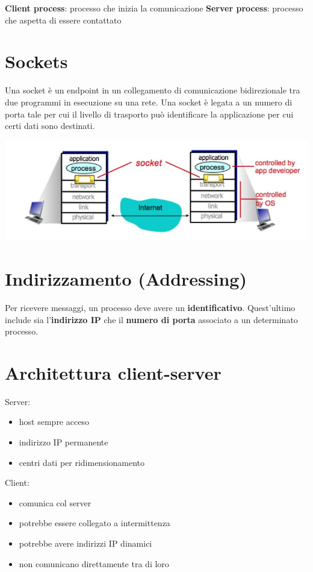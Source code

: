 \textbf{Client process}: processo che inizia la comunicazione
\textbf{Server process}: processo che aspetta di essere contattato 

\section{Sockets}
Una socket è un endpoint in un collegamento di comunicazione bidirezionale tra due programmi in esecuzione su una rete. Una socket è legata a un numero di porta tale per cui il livello di trasporto può identificare la applicazione per cui certi dati sono destinati.

\begin{center}
\includegraphics[scale=0.4]{Images/TecnologieWeb/1/Sockets.jpg}    
\end{center}

\section{Indirizzamento (Addressing)}
Per ricevere messaggi, un processo deve avere un \textbf{identificativo}. Quest'ultimo include sia l'\textbf{indirizzo IP} che il \textbf{numero di porta} associato a un determinato processo. 

\section{Architettura client-server}
Server:
\begin{itemize}
    \item host sempre acceso
    \item indirizzo IP permanente
    \item centri dati per ridimensionamento
\end{itemize}

Client:
\begin{itemize}
    \item comunica col server
    \item potrebbe essere collegato a intermittenza
    \item potrebbe avere indirizzi IP dinamici
    \item non comunicano direttamente tra di loro
\end{itemize}


